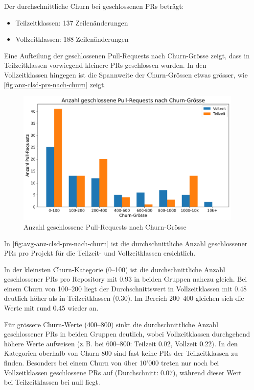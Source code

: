 Der durchschnittliche Churn bei geschlossenen PRs beträgt: \begin{itemize} \item Teilzeitklassen: 137 Zeilenänderungen \item Vollzeitklassen: 188 Zeilenänderungen \end{itemize}

Eine Aufteilung der geschlossenen Pull-Requests nach Churn-Grösse zeigt, dass in Teilzeitklassen vorwiegend kleinere PRs geschlossen wurden. In den Vollzeitklassen hingegen ist die Spannweite der Churn-Grössen etwas grösser, wie \autoref{fig:anz-clsd-prs-nach-churn} zeigt.

\begin{figure}[htbp]
    \includegraphics[width=\textwidth]{Figures/anzahl-geschlossene-prs-nach-churn.pdf}
    \caption{Anzahl geschlossene Pull-Requests nach Churn-Grösse}
    \label{fig:anz-clsd-prs-nach-churn}
\end{figure}

\newpage
In \autoref{fig:avg-anz-clsd-prs-nach-churn} ist die durchschnittliche Anzahl geschlossener PRs pro Projekt für die Teilzeit- und Vollzeitklassen ersichtlich.

In der kleinsten Churn-Kategorie (0--100) ist die durchschnittliche Anzahl geschlossener PRs pro Repository mit 0.93 in beiden Gruppen nahezu gleich. Bei einem Churn von 100--200 liegt der Durchschnittswert in Vollzeitklassen mit 0.48 deutlich höher als in Teilzeitklassen (0.30). Im Bereich 200--400 gleichen sich die Werte mit rund 0.45 wieder an.

Für grössere Churn-Werte (400--800) sinkt die durchschnittliche Anzahl geschlossener PRs in beiden Gruppen deutlich, wobei Vollzeitklassen durchgehend höhere Werte aufweisen (z.\,B. bei 600--800: Teilzeit 0.02, Vollzeit 0.22). In den Kategorien oberhalb von Churn 800 sind fast keine PRs der Teilzeitklassen zu finden. Besonders bei einem Churn von über 10'000 treten nur noch bei Vollzeitklassen geschlossene PRs auf (Durchschnitt: 0.07), während dieser Wert bei Teilzeitklassen bei null liegt.

